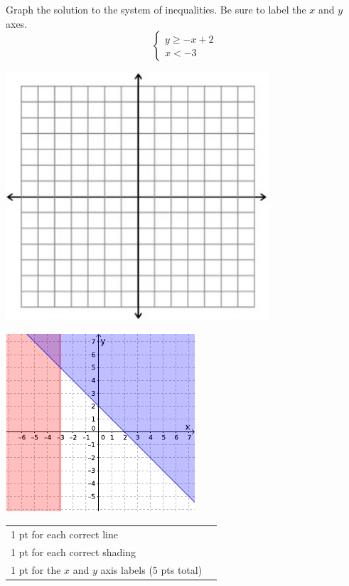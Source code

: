 {
	Graph the solution to the system of inequalities. Be sure to label the $x$ and $y$ axes. $$\begin{cases}y\geq -x+2 \\ x<-3 \end{cases}$$\begin{onlyproblem}\begin{center}\includegraphics{fig-graphpaper.png}\end{center}\end{onlyproblem} \begin{onlysolution}\begin{center}\includegraphics{fig095-12-5-c-answer}\end{center}\end{onlysolution}
	
}
{
	\begin{tabular}{l r}
	1 pt for each correct line\\
	1 pt for each correct shading\\
	1 pt for the $x$ and $y$ axis labels (5 pts total)\\
	\end{tabular}
}

